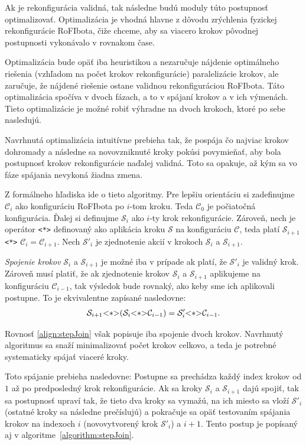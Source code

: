 \documentclass[
  digital, %
  oneside, %
  notable,   %
  lof,     %
  nolot,     %
]{fithesis3}
\begin{document}
Ak je rekonfigurácia validná, tak následne budú moduly túto postupnosť optimalizovať. Optimalizácia je vhodná hlavne z dôvodu zrýchlenia fyzickej rekonfigurácie RoFIbota, čiže chceme, aby sa viacero krokov pôvodnej postupnosti vykonávalo v rovnakom čase. 

Optimalizácia bude opäť iba heuristikou a nezaručuje nájdenie optimálneho riešenia (vzhľadom na počet krokov rekonfigurácie) paralelizácie krokov, ale zaručuje, že nájdené riešenie ostane validnou rekonfiguráciou RoFIbota. Táto optimalizácia spočíva v dvoch fázach, a to v spájaní krokov a v ich výmenách. Tieto optimalizácie je možné robiť výhradne na dvoch krokoch, ktoré po sebe nasledujú. 

Navrhnutá optimalizácia intuitívne prebieha tak, že pospája čo najviac krokov dohromady a následne sa novovzniknuté kroky pokúsi povymieňať, aby bola postupnosť krokov rekonfigurácie naďalej validná. Toto sa opakuje, až kým sa vo fáze spájania nevykoná žiadna zmena. 

Z formálneho hľadiska ide o tieto algoritmy. Pre lepšiu orientáciu si zadefinujme $\mathcal{C}_i$ ako konfiguráciu RoFIbota po $i$-tom kroku. Teda $\mathcal{C}_0$ je počiatočná konfigurácia. Ďalej si definujme $\mathcal{S}_i$ ako $i$-ty krok rekonfigurácie. Zároveň, nech je operátor \lstinline{<*>} definovaný ako aplikácia kroku $\mathcal{S}$ na konfiguráciu $\mathcal{C}$, teda platí $\mathcal{S}_{i + 1}$ \lstinline{<*>} $\mathcal{C}_i = \mathcal{C}_{i + 1}$. Nech $\mathcal{S}'_i$ je zjednotenie akcií v krokoch $\mathcal{S}_i$ a $\mathcal{S}_{i + 1}$. 

\textit{Spojenie krokov} $\mathcal{S}_i$ a $\mathcal{S}_{i + 1}$ je možné iba v prípade ak platí, že $\mathcal{S}'_i$ je validný krok. Zároveň musí platiť, že ak zjednotenie krokov $\mathcal{S}_i$ a $\mathcal{S}_{i + 1}$ aplikujeme na konfiguráciu $\mathcal{C}_{i - 1}$, tak výsledok bude rovnaký, ako keby sme ich aplikovali postupne. To je ekvivalentne zapísané nasledovne: 
\begin{align}
\label{align:stepJoin}
\mathcal{S}_{i + 1} \lstinline{<*>} (\mathcal{S}_i \lstinline{<*>} \mathcal{C}_{i - 1}) = \mathcal{S}'_i \lstinline{<*>} \mathcal{C}_{i - 1}. 
\end{align}

Rovnosť \ref{align:stepJoin} však popisuje iba spojenie dvoch krokov. Navrhnutý algoritmus sa snaží minimalizovať počet krokov celkovo, a teda je potrebné systematicky spájať viaceré kroky. 

Toto spájanie prebieha nasledovne: Postupne sa prechádza každý index krokov od $1$ až po predposledný krok rekonfigurácie. Ak sa kroky $\mathcal{S}_i$ a $\mathcal{S}_{i + 1}$ dajú spojiť, tak sa postupnosť upraví tak, že tieto dva kroky sa vymažú, na ich miesto sa vloží $\mathcal{S}'_i$ (ostatné kroky sa následne prečíslujú) a pokračuje sa opäť testovaním spájania krokov na indexoch $i$ (novovytvorený krok $\mathcal{S}'_i$) a $i + 1$. Tento postup je popísaný aj v algoritme~\ref{algorithm:stepJoin}. 
\end{document}
